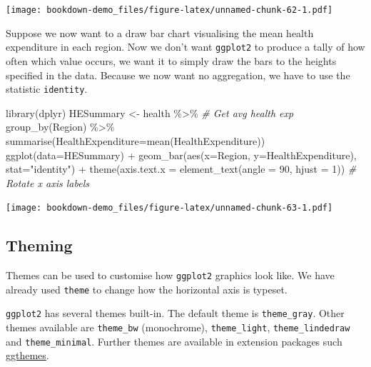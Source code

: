 \documentclass[
]{book}
\newenvironment{Shaded}{\begin{snugshade}}{\end{snugshade}}
\newcommand{\AttributeTok}[1]{\textcolor[rgb]{0.77,0.63,0.00}{#1}}
\newcommand{\CommentTok}[1]{\textcolor[rgb]{0.56,0.35,0.01}{\textit{#1}}}
\newcommand{\DecValTok}[1]{\textcolor[rgb]{0.00,0.00,0.81}{#1}}
\newcommand{\FunctionTok}[1]{\textcolor[rgb]{0.00,0.00,0.00}{#1}}
\newcommand{\NormalTok}[1]{#1}
\newcommand{\OtherTok}[1]{\textcolor[rgb]{0.56,0.35,0.01}{#1}}
\newcommand{\SpecialCharTok}[1]{\textcolor[rgb]{0.00,0.00,0.00}{#1}}
\newcommand{\StringTok}[1]{\textcolor[rgb]{0.31,0.60,0.02}{#1}}
\begin{document}
\texttt{[image: bookdown-demo\_files/figure-latex/unnamed-chunk-62-1.pdf]}

Suppose we now want to a draw bar chart visualising the mean health expenditure in each region. Now we don't want \texttt{ggplot2} to produce a tally of how often which value occurs, we want it to simply draw the bars to the heights specified in the data. Because we now want no aggregation, we have to use the statistic \texttt{identity}.

\begin{Shaded}
\begin{Highlighting}[]
\FunctionTok{library}\NormalTok{(dplyr)}
\NormalTok{HESummary }\OtherTok{\textless{}{-}}\NormalTok{ health }\SpecialCharTok{\%\textgreater{}\%}                                      \CommentTok{\# Get avg health exp}
                 \FunctionTok{group\_by}\NormalTok{(Region) }\SpecialCharTok{\%\textgreater{}\%} 
                 \FunctionTok{summarise}\NormalTok{(}\AttributeTok{HealthExpenditure=}\FunctionTok{mean}\NormalTok{(HealthExpenditure))}
\FunctionTok{ggplot}\NormalTok{(}\AttributeTok{data=}\NormalTok{HESummary) }\SpecialCharTok{+}
    \FunctionTok{geom\_bar}\NormalTok{(}\FunctionTok{aes}\NormalTok{(}\AttributeTok{x=}\NormalTok{Region, }\AttributeTok{y=}\NormalTok{HealthExpenditure), }\AttributeTok{stat=}\StringTok{"identity"}\NormalTok{) }\SpecialCharTok{+}
    \FunctionTok{theme}\NormalTok{(}\AttributeTok{axis.text.x =} \FunctionTok{element\_text}\NormalTok{(}\AttributeTok{angle =} \DecValTok{90}\NormalTok{, }\AttributeTok{hjust =} \DecValTok{1}\NormalTok{)) }\CommentTok{\# Rotate x axis labels}
\end{Highlighting}
\end{Shaded}

\texttt{[image: bookdown-demo\_files/figure-latex/unnamed-chunk-63-1.pdf]}

\hypertarget{theming}{%
\subsection{Theming}\label{theming}}

Themes can be used to customise how \texttt{ggplot2} graphics look like. We have already used \texttt{theme} to change how the horizontal axis is typeset.

\texttt{ggplot2} has several themes built-in. The default theme is \texttt{theme\_gray}. Other themes available are \texttt{theme\_bw} (monochrome), \texttt{theme\_light}, \texttt{theme\_lindedraw} and \texttt{theme\_minimal}. Further themes are available in extension packages such \href{https://cran.r-project.org/web/packages/ggthemes}{ggthemes}.
\end{document}
